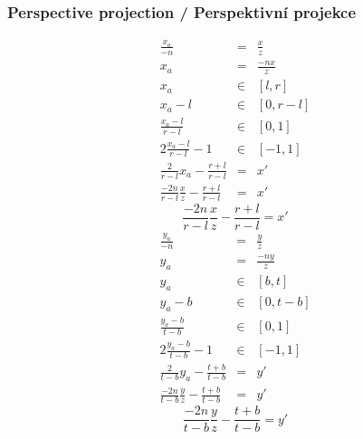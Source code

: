 \begin{frame}
\frametitle{Perspective projection / Perspektivní projekce}
\begin{multicols}{2}
{\tiny
\begin{eqnarray*}
	\frac{x_a}{-n} &=& \frac{x}{z} \\
	x_a &=& \frac{-nx}{z} \\
	x_a &\in& [l,r] \\
	x_a-l &\in& [0,r-l] \\
	\frac{x_a-l}{r-l} &\in& [0,1] \\
	2\frac{x_a-l}{r-l}-1 &\in& [-1,1] \\
	\frac{2}{r-l}x_a-\frac{r+l}{r-l} &=& x'\\
	\frac{-2n}{r-l} \frac{x}{z} - \frac{r+l}{r-l} &=& x'
\end{eqnarray*}
\begin{equation}
\label{eq:persx}
\frac{-2n}{r-l} \frac{x}{z} - \frac{r+l}{r-l} = x'
\end{equation}
}
\vfill
{\tiny
\begin{eqnarray*}
	\frac{y_a}{-n} &=& \frac{y}{z} \\
	y_a &=& \frac{-ny}{z} \\
	y_a &\in& [b,t] \\
	y_a-b &\in& [0,t-b] \\
	\frac{y_a-b}{t-b} &\in& [0,1] \\
	2\frac{y_a-b}{t-b}-1 &\in& [-1,1] \\
	\frac{2}{t-b}y_a-\frac{t+b}{t-b} &=& y'\\
	\frac{-2n}{t-b} \frac{y}{z} - \frac{t+b}{t-b} &=& y'
\end{eqnarray*}
\begin{equation}
\label{eq:persy}
\frac{-2n}{t-b} \frac{y}{z} - \frac{t+b}{t-b} = y'
\end{equation}
}
\end{multicols}

\end{frame}

